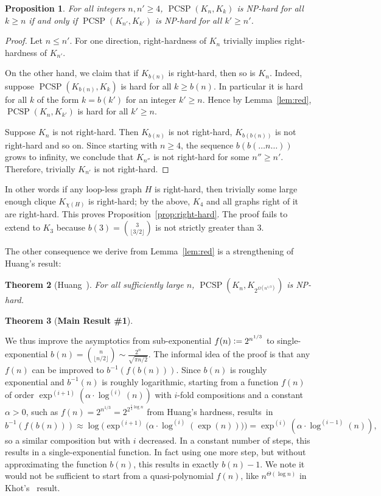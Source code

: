 \documentclass[11pt,a4paper]{scrartcl}
\newtheorem{theorem}{Theorem}
\numberwithin{theorem}{section}
\newtheorem{proposition}[theorem]{Proposition}
\theoremstyle{definition}
\newcommand{\defeq}{\vcentcolon=}
\DeclareMathOperator{\PCSP}{PCSP}
\newcommand\B[1]{{\textstyle\binom{#1}{\lfloor #1/2 \rfloor}}}
\begin{document}
\begin{proposition}\label{prop:rightHard}
	For all integers $n,n' \geq 4$,
		$\PCSP(K_n,K_k)$ is NP-hard for all $k\geq n$
		if and only if 
		$\PCSP(K_{n'},K_{k'})$ is NP-hard for all $k' \geq n'$.
\end{proposition}
\begin{proof}
	Let $n \leq n'$.
	For one direction, right-hardness of $K_n$ trivially implies right-hardness of $K_{n'}$.
	
	On the other hand, we claim that if $K_{b(n)}$ is right-hard, then so is $K_n$.
	Indeed, suppose $\PCSP(K_{b(n)},K_k)$ is hard for all $k \geq b(n)$.
	In particular it is hard for all $k$ of the form $k=b(k')$ for an integer $k' \geq n$.
	Hence by Lemma~\ref{lem:red}, $\PCSP(K_n,K_{k'})$ is hard for all $k' \geq n$.
	
	Suppose $K_n$ is not right-hard.
	Then $K_{b(n)}$ is not right-hard, $K_{b(b(n))}$ is not right-hard and so on.
	Since starting with $n\geq 4$, the sequence $b(b(\dots n \dots))$ grows to infinity,
	we conclude that $K_{n''}$ is not right-hard for some $n'' \geq n'$.
	Therefore, trivially $K_{n'}$ is not right-hard.
\end{proof}
In other words if any loop-less graph $H$ is right-hard, then trivially some
large enough clique $K_{\chi(H)}$ is right-hard; by the above, $K_4$ and all graphs right of it are right-hard.
This proves Proposition~\ref{prop:right-hard}.
The proof fails to extend to $K_3$ because $b(3)=\B{3}$ is not strictly greater than 3.

\bigskip
The other consequence we derive from Lemma~\ref{lem:red} is a strengthening of Huang's result:

\begin{theorem}[Huang~\cite{Huang13}]\label{thm:Huang}
	For all sufficiently large $n$, $\PCSP(K_n, K_{2^{\Omega(n^{1/3})}})$ is NP-hard.
\end{theorem}

{\renewcommand{\thetheorem}{\getrefnumber{thm:asymp}}
	\begin{theorem}[\textbf{Main Result \#1}]
		\ThmAsymp
	\end{theorem}
	\addtocounter{theorem}{-1}
}
We thus improve the asymptotics from sub-exponential $f(n) \defeq 2^{n^{1/3}}$ to single-exponential $b(n) = \B{n} \sim \frac{2^n}{\sqrt{\pi n/2}}$.
The informal idea of the proof is that any $f(n)$ can be improved to $b^{-1}(f(b(n)))$.
Since $b(n)$ is roughly exponential and $b^{-1}(n)$ is roughly logarithmic, starting from a function $f(n)$ of order $\exp^{(i+1)}(\alpha \cdot \log^{(i)}(n))$ with $i$-fold compositions and a constant $\alpha > 0$, such as $f(n)=2^{n^{1/3}} = 2^{2^{\frac{1}{3} \log n}}$ from Huang's hardness,
results~in 
\[b^{-1}(f(b(n))) \approx \log\Big(\exp^{(i+1)}\big(\alpha \cdot \log^{(i)}(\exp(n))\big)\Big) = \exp^{(i)}(\alpha \cdot \log^{(i-1)}(n)),\]
so a similar composition but with $i$ decreased.
In a constant number of steps, this results in a single-exponential function.
In fact using one more step, but without approximating the function $b(n)$, this results in exactly $b(n)-1$.
We note it would not be sufficient to start from a quasi-polynomial $f(n)$, like
$n^{\Theta(\log n)}$ in Khot's~\cite{Khot01} result.
\end{document}
